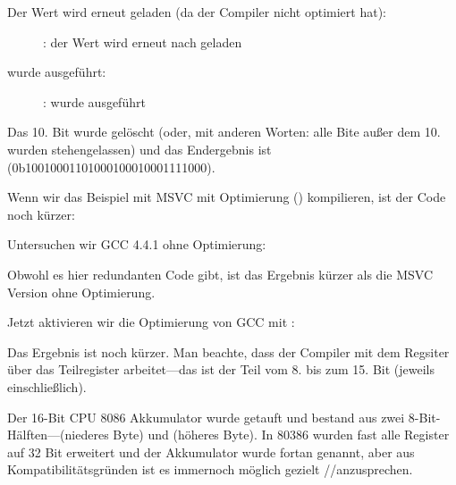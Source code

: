 \clearpage
Der Wert wird erneut geladen (da der Compiler nicht optimiert hat):

\begin{figure}[H]
\centering
{}
\caption{\olly: der Wert wird erneut nach \EDX geladen}
\label{fig:set_reset_olly3}
\end{figure}

\clearpage
\AND wurde ausgeführt:

\begin{figure}[H]
\centering
{}
\caption{\olly: \AND wurde ausgeführt}
\label{fig:set_reset_olly4}
\end{figure}
Das 10. Bit wurde gelöscht (oder, mit anderen Worten: alle Bite außer dem 10.
wurden stehengelassen) und das Endergebnis ist\\
 (0b1001000110100010001{\color{red}0}001111000).


Wenn wir das Beispiel mit MSVC mit Optimierung (\Ox) kompilieren, ist der Code
noch kürzer:




Untersuchen wir GCC 4.4.1 ohne Optimierung:


Obwohl es hier redundanten Code gibt, ist das Ergebnis kürzer als die MSVC
Version ohne Optimierung.

Jetzt aktivieren wir die Optimierung von GCC mit \Othree: 




Das Ergebnis ist noch kürzer.
Man beachte, dass der Compiler mit dem \EAX Regsiter über das Teilregister \AH
arbeitet---das ist der Teil vom 8. bis zum 15. Bit (jeweils einschließlich).


Der 16-Bit CPU 8086 Akkumulator wurde \AX getauft und bestand aus zwei
8-Bit-Hälften---\AL (niederes Byte) und \AH (höheres Byte).
In 80386 wurden fast alle Register auf 32 Bit erweitert und der Akkumulator
wurde fortan \EAX genannt, aber aus Kompatibilitätsgründen ist es immernoch
möglich gezielt \AX/\AH/\AL anzusprechen.

